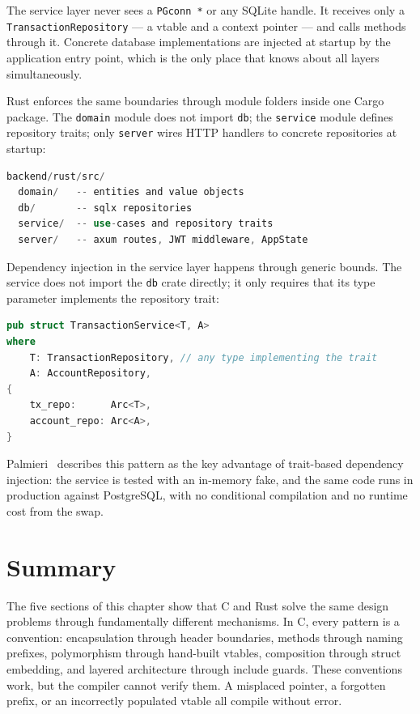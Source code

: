 The service layer never sees a \texttt{PGconn *} or any SQLite handle.
It receives only a \texttt{TransactionRepository} --- a vtable and a
context pointer --- and calls methods through it. Concrete database
implementations are injected at startup by the application entry point,
which is the only place that knows about all layers simultaneously.

Rust enforces the same boundaries through module folders inside one Cargo
package. The \texttt{domain} module does not import \texttt{db}; the
\texttt{service} module defines repository traits; only \texttt{server}
wires HTTP handlers to concrete repositories at startup:

\begin{lstlisting}[language=Rust, caption={backend/rust/src/ module layout.
Folder boundaries replace C header boundaries; dependency direction is enforced
by \texttt{mod} declarations and imports.}]
backend/rust/src/
  domain/   -- entities and value objects
  db/       -- sqlx repositories
  service/  -- use-cases and repository traits
  server/   -- axum routes, JWT middleware, AppState
\end{lstlisting}

Dependency injection in the service layer happens through generic bounds.
The service does not import the \texttt{db} crate directly; it only requires
that its type parameter implements the repository trait:

\begin{lstlisting}[language=Rust, caption={service/transaction.rs ---
\texttt{TransactionService} depends on a trait, not a concrete type.}]
pub struct TransactionService<T, A>
where
    T: TransactionRepository, // any type implementing the trait
    A: AccountRepository,
{
    tx_repo:      Arc<T>,
    account_repo: Arc<A>,
}
\end{lstlisting}

Palmieri~\cite{Palmieri2022} describes this pattern as the key advantage
of trait-based dependency injection: the service is tested with an
in-memory fake, and the same code runs in production against PostgreSQL,
with no conditional compilation and no runtime cost from the swap.

\section*{Summary}

The five sections of this chapter show that C and Rust solve the same
design problems through fundamentally different mechanisms. In C, every
pattern is a convention: encapsulation through header boundaries,
methods through naming prefixes, polymorphism through hand-built vtables,
composition through struct embedding, and layered architecture through
include guards. These conventions work, but the compiler cannot verify
them. A misplaced pointer, a forgotten prefix, or an incorrectly populated
vtable all compile without error.

